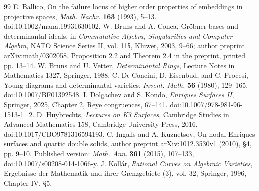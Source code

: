 \begin{thebibliography}{99}
 E. Ballico, On the failure locus of higher order
properties of embeddings in projective spaces, \emph{Math. Nachr.}
\textbf{163} (1993), 5--13. doi:10.1002/mana.19931630102.
 W. Bruns and A. Conca, Gr\"obner bases and determinantal
ideals, in \emph{Commutative Algebra, Singularities and Computer Algebra},
NATO Science Series II, vol. 115, Kluwer, 2003, 9--66;
author preprint arXiv:math/0302058. Proposition 2.2 and Theorem 2.4
in the preprint, printed pp. 13--14.
 W. Bruns and U. Vetter, \emph{Determinantal Rings},
Lecture Notes in Mathematics 1327, Springer, 1988.
 C. De Concini, D. Eisenbud, and C. Procesi,
Young diagrams and determinantal varieties, \emph{Invent. Math.}
\textbf{56} (1980), 129--165. doi:10.1007/BF01392548.
 I. Dolgachev and S. Kond\=o, \emph{Enriques Surfaces II},
Springer, 2025, Chapter 2, Reye congruences, 67--141.
doi:10.1007/978-981-96-1513-1\_2.
 D. Huybrechts, \emph{Lectures on K3 Surfaces},
Cambridge Studies in Advanced Mathematics 158, Cambridge University
Press, 2016. doi:10.1017/CBO9781316594193.
 C. Ingalls and A. Kuznetsov, On nodal Enriques surfaces
and quartic double solids, author preprint arXiv:1012.3530v1 (2010),
\S4, pp. 9--10. Published version: \emph{Math. Ann.} \textbf{361}
(2015), 107--133, doi:10.1007/s00208-014-1066-y.
 J. Koll\'ar, \emph{Rational Curves on Algebraic
Varieties}, Ergebnisse der Mathematik und ihrer Grenzgebiete (3),
vol. 32, Springer, 1996, Chapter IV, \S5.
\end{thebibliography}
